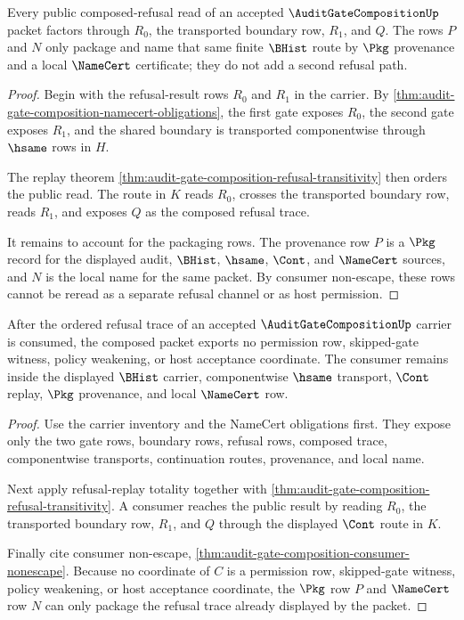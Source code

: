 \begin{theorem}
\label{thm:audit-gate-composition-refusal-replay-totality}
Every public composed-refusal read of an accepted $\AuditGateCompositionUp$
packet factors through $R_0$, the transported boundary row, $R_1$, and $Q$.
The rows $P$ and $N$ only package and name that same finite $\BHist$ route by
$\Pkg$ provenance and a local $\NameCert$ certificate; they do not add a
second refusal path.
\end{theorem}
\begin{proof}
Begin with the refusal-result rows $R_0$ and $R_1$ in the carrier. By
\autoref{thm:audit-gate-composition-namecert-obligations}, the first gate
exposes $R_0$, the second gate exposes $R_1$, and the shared boundary is
transported componentwise through $\hsame$ rows in $H$.

The replay theorem \autoref{thm:audit-gate-composition-refusal-transitivity}
then orders the public read. The route in $K$ reads $R_0$, crosses the
transported boundary row, reads $R_1$, and exposes $Q$ as the composed
refusal trace.

It remains to account for the packaging rows. The provenance row $P$ is a
$\Pkg$ record for the displayed audit, $\BHist$, $\hsame$, $\Cont$, and
$\NameCert$ sources, and $N$ is the local name for the same packet. By
consumer non-escape, these rows cannot be reread as a separate refusal
channel or as host permission.
\end{proof}

\begin{theorem}
\label{thm:audit-gate-composition-consumer-permission-exclusion}
After the ordered refusal trace of an accepted $\AuditGateCompositionUp$
carrier is consumed, the composed packet exports no permission row,
skipped-gate witness, policy weakening, or host acceptance coordinate. The
consumer remains inside the displayed $\BHist$ carrier, componentwise
$\hsame$ transport, $\Cont$ replay, $\Pkg$ provenance, and local $\NameCert$
row.
\end{theorem}
\begin{proof}
Use the carrier inventory and the NameCert obligations first. They expose
only the two gate rows, boundary rows, refusal rows, composed trace,
componentwise transports, continuation routes, provenance, and local name.

Next apply refusal-replay totality together with
\autoref{thm:audit-gate-composition-refusal-transitivity}. A consumer reaches
the public result by reading $R_0$, the transported boundary row, $R_1$, and
$Q$ through the displayed $\Cont$ route in $K$.

Finally cite consumer non-escape,
\autoref{thm:audit-gate-composition-consumer-nonescape}. Because no
coordinate of $C$ is a permission row, skipped-gate witness, policy
weakening, or host acceptance coordinate, the $\Pkg$ row $P$ and
$\NameCert$ row $N$ can only package the refusal trace already displayed by
the packet.
\end{proof}

